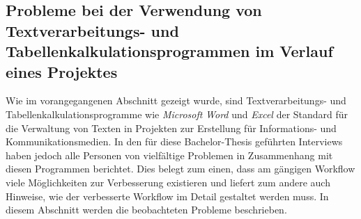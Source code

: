 
\subsection{Probleme bei der Verwendung von Textverarbeitungs- und Tabellenkalkulationsprogrammen im Verlauf eines Projektes}
\label{l:officeprobleme}

Wie im vorangegangenen Abschnitt gezeigt wurde, sind Textverarbeitungs- und Tabellenkalkulationsprogramme wie \emph{Microsoft} \emph{Word} und \emph{Excel} der Standard für die Verwaltung von Texten in Projekten zur Erstellung für Informations- und Kommunikationsmedien. In den für diese Bachelor-Thesis geführten Interviews haben jedoch alle Personen von vielfältige Problemen in Zusammenhang mit diesen Programmen berichtet. Dies belegt zum einen, dass am gängigen Workflow viele Möglichkeiten zur Verbesserung existieren und liefert zum andere auch Hinweise, wie der verbesserte Workflow im Detail gestaltet werden muss. In diesem Abschnitt werden die beobachteten Probleme beschrieben.

